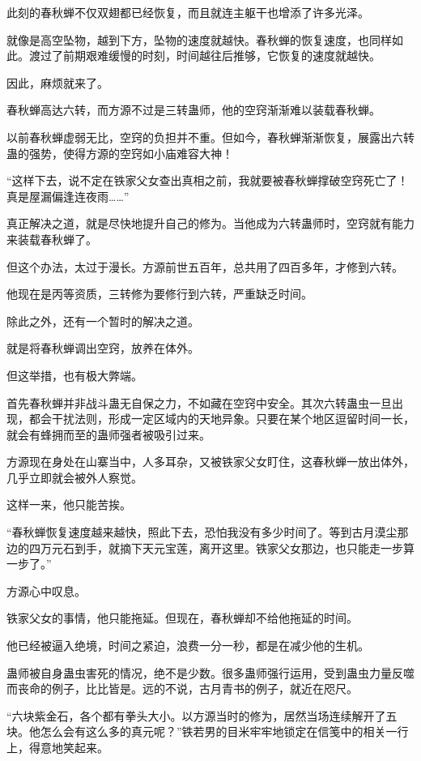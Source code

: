 \begin{this_body}
此刻的春秋蝉不仅双翅都已经恢复，而且就连主躯干也增添了许多光泽。

就像是高空坠物，越到下方，坠物的速度就越快。春秋蝉的恢复速度，也同样如此。渡过了前期艰难缓慢的时刻，时间越往后推够，它恢复的速度就越快。

因此，麻烦就来了。

春秋蝉高达六转，而方源不过是三转蛊师，他的空窍渐渐难以装载春秋蝉。

以前春秋蝉虚弱无比，空窍的负担并不重。但如今，春秋蝉渐渐恢复，展露出六转蛊的强势，使得方源的空窍如小庙难容大神！

“这样下去，说不定在铁家父女查出真相之前，我就要被春秋蝉撑破空窍死亡了！真是屋漏偏逢连夜雨……”

真正解决之道，就是尽快地提升自己的修为。当他成为六转蛊师时，空窍就有能力来装载春秋蝉了。

但这个办法，太过于漫长。方源前世五百年，总共用了四百多年，才修到六转。

他现在是丙等资质，三转修为要修行到六转，严重缺乏时间。

除此之外，还有一个暂时的解决之道。

就是将春秋蝉调出空窍，放养在体外。

但这举措，也有极大弊端。

首先春秋蝉并非战斗蛊无自保之力，不如藏在空窍中安全。其次六转蛊虫一旦出现，都会干扰法则，形成一定区域内的天地异象。只要在某个地区逗留时间一长，就会有蜂拥而至的蛊师强者被吸引过来。

方源现在身处在山寨当中，人多耳杂，又被铁家父女盯住，这春秋蝉一放出体外，几乎立即就会被外人察觉。

这样一来，他只能苦挨。

“春秋蝉恢复速度越来越快，照此下去，恐怕我没有多少时间了。等到古月漠尘那边的四万元石到手，就摘下天元宝莲，离开这里。铁家父女那边，也只能走一步算一步了。”

方源心中叹息。

铁家父女的事情，他只能拖延。但现在，春秋蝉却不给他拖延的时间。

他已经被逼入绝境，时间之紧迫，浪费一分一秒，都是在减少他的生机。

蛊师被自身蛊虫害死的情况，绝不是少数。很多蛊师强行运用，受到蛊虫力量反噬而丧命的例子，比比皆是。远的不说，古月青书的例子，就近在咫尺。

“六块紫金石，各个都有拳头大小。以方源当时的修为，居然当场连续解开了五块。他怎么会有这么多的真元呢？”铁若男的目米牢牢地锁定在信笺中的相关一行上，得意地笑起来。


\end{this_body}
